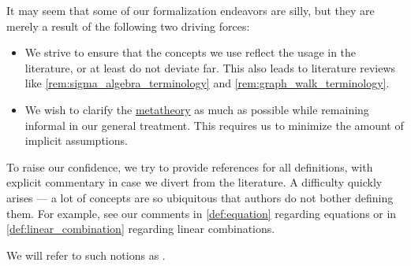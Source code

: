 \begin{concept}\label{con:assumed_knowledge}
  It may seem that some of our formalization endeavors are silly, but they are merely a result of the following two driving forces:
  \begin{itemize}
    \item We strive to ensure that the concepts we use reflect the usage in the literature, or at least do not deviate far. This also leads to literature reviews like \cref{rem:sigma_algebra_terminology} and \cref{rem:graph_walk_terminology}.

    \item We wish to clarify the \hyperref[con:metalogic]{metatheory} as much as possible while remaining informal in our general treatment. This requires us to minimize the amount of implicit assumptions.
  \end{itemize}

  To raise our confidence, we try to provide references for all definitions, with explicit commentary in case we divert from the literature. A difficulty quickly arises --- a lot of concepts are so ubiquitous that authors do not bother defining them. For example, see our comments in \cref{def:equation} regarding equations or in \cref{def:linear_combination} regarding linear combinations.

  We will refer to such notions as .
\end{concept}
